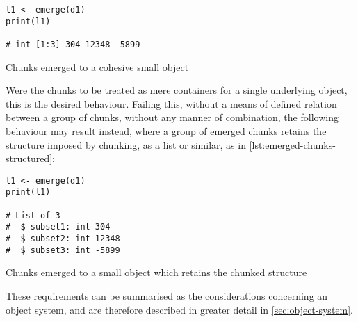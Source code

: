 \begin{listing}
    \begin{verbatim}
l1 <- emerge(d1)
print(l1)

# int [1:3] 304 12348 -5899
\end{verbatim}
    \caption{Chunks emerged to a cohesive small object}
    \label{lst:emerged-chunks}
\end{listing}

Were the chunks to be treated as mere containers for a single underlying
object, this is the desired behaviour. Failing this, without a means of
defined relation between a group of chunks, without any manner of
combination, the following behaviour may result instead, where a group
of emerged chunks retains the structure imposed by chunking, as a list
or similar, as in \ref{lst:emerged-chunks-structured}:

\begin{listing}
    \begin{verbatim}
l1 <- emerge(d1)
print(l1)

# List of 3
#  $ subset1: int 304
#  $ subset2: int 12348
#  $ subset3: int -5899
\end{verbatim}
    \caption{Chunks emerged to a small object which retains the chunked structure}
    \label{lst:emerged-chunks-structured}
\end{listing}

These requirements can be summarised as the considerations concerning an
object system, and are therefore described in greater detail in
\ref{sec:object-system}.